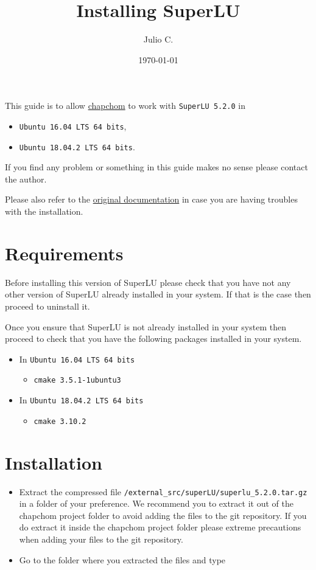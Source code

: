 \documentclass[11pt]{article}
\author{Julio C.}
\date{\today}
\title{Installing SuperLU}
\begin{document}
\maketitle
\tableofcontents

This guide is to allow \href{https://github.com/tachidok/chapchom}{chapchom} to work with \texttt{SuperLU 5.2.0} in
\begin{itemize}
\item \texttt{Ubuntu 16.04 LTS 64 bits},
\item \texttt{Ubuntu 18.04.2 LTS 64 bits}.
\end{itemize}
If you find any problem or something in this guide makes no sense
please contact the author.

Please also refer to the \href{http://crd-legacy.lbl.gov/~xiaoye/SuperLU/}{original documentation} in case you are having
troubles with the installation.

\section{Requirements}
\label{sec-1}
Before installing this version of SuperLU please check that you have
not any other version of SuperLU already installed in your system. If
that is the case then proceed to uninstall it.

Once you ensure that SuperLU is not already installed in your system
then proceed to check that you have the following packages installed
in your system.
\begin{itemize}
\item In \texttt{Ubuntu 16.04 LTS 64 bits}
\begin{itemize}
\item \texttt{cmake 3.5.1-1ubuntu3}
\end{itemize}
\item In \texttt{Ubuntu 18.04.2 LTS 64 bits}
\begin{itemize}
\item \texttt{cmake 3.10.2}
\end{itemize}
\end{itemize}

\section{Installation}
\label{sec-2}

\begin{itemize}
\item Extract the compressed file
\texttt{/external\_src/superLU/superlu\_5.2.0.tar.gz} in a folder of your
preference. We recommend you to extract it out of the chapchom
project folder to avoid adding the files to the git repository. If
you do extract it inside the chapchom project folder please extreme
precautions when adding your files to the git repository.

\item Go to the folder where you extracted the files and type
\end{itemize}
\end{document}
